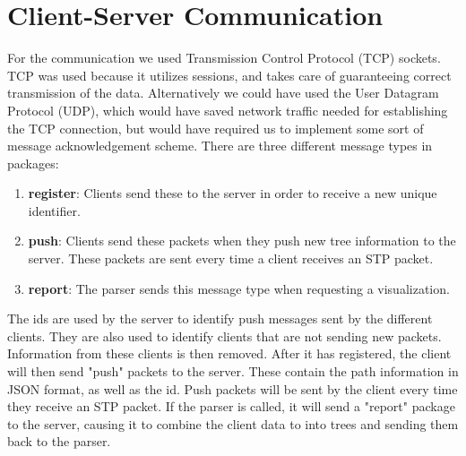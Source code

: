 \section{Client-Server Communication}
For the communication we used Transmission Control Protocol (TCP) sockets.
TCP was used because it utilizes sessions, and takes care of guaranteeing correct transmission of the data.
Alternatively we could have used the User Datagram Protocol (UDP), which would have saved network traffic needed for establishing the TCP connection, but would have required us to implement some sort of message acknowledgement scheme.
There are three different message types in packages:
\begin{enumerate}
    \item \textbf{register}: Clients send these to the server in order to receive a new unique identifier.
    \item \textbf{push}: Clients send these packets when they push new tree information to the server.
        These packets are sent every time a client receives an STP packet.
    \item \textbf{report}: The parser sends this message type when requesting a visualization.
\end{enumerate}
The ids are used by the server to identify push messages sent by the different clients.
They are also used to identify clients that are not sending new packets.
Information from these clients is then removed.
After it has registered, the client will then send "push" packets to the server.
These contain the path information in JSON format, as well as the id.
Push packets will be sent by the client every time they receive an STP packet.
If the parser is called, it will send a "report" package to the server, causing it to combine the client data to into trees and sending them back to the parser.
